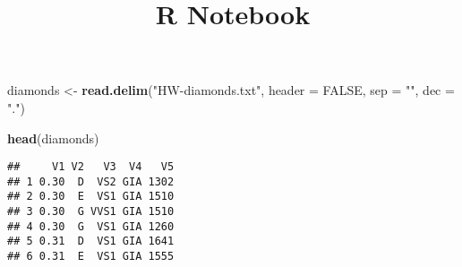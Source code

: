 \documentclass[]{article}
\title{R Notebook}
\author{}
\date{}
\newenvironment{Shaded}{\begin{snugshade}}{\end{snugshade}}
\newcommand{\KeywordTok}[1]{\textcolor[rgb]{0.13,0.29,0.53}{\textbf{#1}}}
\newcommand{\DataTypeTok}[1]{\textcolor[rgb]{0.13,0.29,0.53}{#1}}
\newcommand{\StringTok}[1]{\textcolor[rgb]{0.31,0.60,0.02}{#1}}
\newcommand{\OtherTok}[1]{\textcolor[rgb]{0.56,0.35,0.01}{#1}}
\newcommand{\OperatorTok}[1]{\textcolor[rgb]{0.81,0.36,0.00}{\textbf{#1}}}
\newcommand{\NormalTok}[1]{#1}
\begin{document}
\maketitle

\begin{Shaded}
\begin{Highlighting}[]
\NormalTok{diamonds <-}\StringTok{ }\KeywordTok{read.delim}\NormalTok{(}\StringTok{"HW-diamonds.txt"}\NormalTok{, }\DataTypeTok{header =} \OtherTok{FALSE}\NormalTok{, }\DataTypeTok{sep =} \StringTok{""}\NormalTok{, }\DataTypeTok{dec =} \StringTok{"."}\NormalTok{)}
\end{Highlighting}
\end{Shaded}

\begin{Shaded}
\begin{Highlighting}[]
\KeywordTok{head}\NormalTok{(diamonds)}
\end{Highlighting}
\end{Shaded}

\begin{verbatim}
##     V1 V2   V3  V4   V5
## 1 0.30  D  VS2 GIA 1302
## 2 0.30  E  VS1 GIA 1510
## 3 0.30  G VVS1 GIA 1510
## 4 0.30  G  VS1 GIA 1260
## 5 0.31  D  VS1 GIA 1641
## 6 0.31  E  VS1 GIA 1555
\end{verbatim}

\begin{Shaded}
\end{Shaded}
\end{document}
